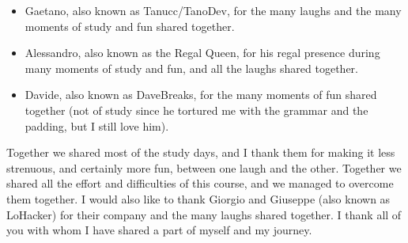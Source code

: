 \begin{spacing}{\myspacing}
\begin{itemize}[nosep] %
    \item Gaetano, also known as Tanucc/TanoDev, for the many laughs and the many moments of study and fun shared together. 
    \item Alessandro, also known as the Regal Queen, for his regal presence during many moments of study and fun, and all the laughs shared together.
    \item Davide, also known as DaveBreaks, for the many moments of fun shared together (not of study since he tortured me with the grammar and the padding, but I still love him).
\end{itemize}
\vspace{2ex}
\noindent Together we shared most of the study days, and I thank them for making it less strenuous, and certainly more fun, between one laugh and the other. Together we shared all the effort and difficulties of this course, and we managed to overcome them together. 
\newline I would also like to thank Giorgio and Giuseppe (also known as LoHacker) for their company and the many laughs shared together.
\newline\newline \noindent I thank all of you with whom I have shared a part of myself and my journey.
\end{spacing}